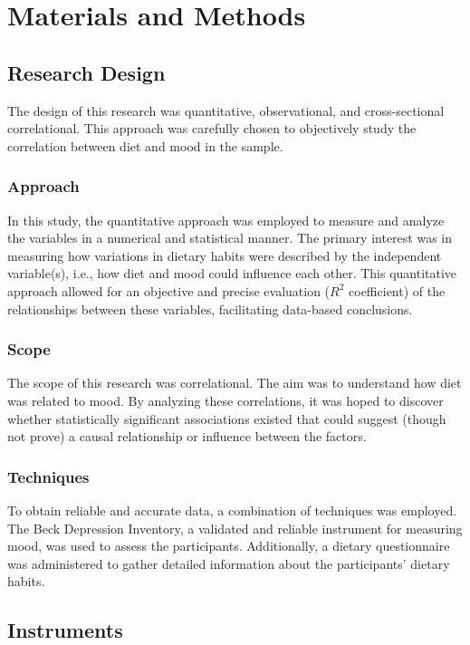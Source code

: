 \documentclass[jou]{apa7}
\begin{document}
\section{Materials and Methods}\label{materiales-y-muxe9todos}

\subsection{Research Design}\label{diseuxf1o-investigaciuxf3n}

The design of this research was quantitative, observational, and cross-sectional correlational. This approach was carefully chosen to objectively study the correlation between diet and mood in the sample.

\subsubsection{Approach}
In this study, the quantitative approach was employed to measure and analyze the variables in a numerical and statistical manner. The primary interest was in measuring how variations in dietary habits were described by the independent variable(s), i.e., how diet and mood could influence each other. This quantitative approach allowed for an objective and precise evaluation ($R^2$ coefficient) of the relationships between these variables, facilitating data-based conclusions.

\subsubsection{Scope}
The scope of this research was correlational.
The aim was to understand how diet was related to mood. By analyzing these correlations, it was hoped to discover whether statistically significant associations existed that could suggest (though not prove) a causal relationship or influence between the factors.

\subsubsection{Techniques}
To obtain reliable and accurate data, a combination of techniques was employed. The Beck Depression Inventory, a validated and reliable instrument for measuring mood, was used to assess the participants. Additionally, a dietary questionnaire was administered to gather detailed information about the participants' dietary habits.


\subsection{Instruments}\label{instrumentos}
\end{document}
